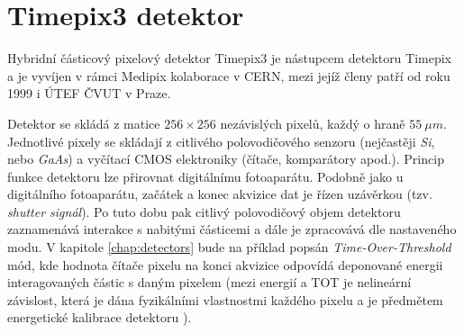 \section{Timepix3 detektor}
Hybridní částicový pixelový detektor Timepix3\cite{timepix3} je nástupcem detektoru Timepix\cite{timepix} a je vyvíjen v rámci Medipix kolaborace v CERN, mezi jejíž členy patří od roku 1999 i ÚTEF ČVUT v Praze.

Detektor se skládá z matice $256\times256$ nezávislých pixelů, každý o hraně $55~\mu m$. 
Jednotlivé pixely se skládají z citlivého polovodičového senzoru (nejčastěji \textit{Si}, nebo \textit{GaAs}) a vyčítací CMOS elektroniky (čítače, komparátory apod.). Princip funkce detektoru lze přirovnat digitálnímu fotoaparátu. Podobně jako u digitálního fotoaparátu, začátek a konec akvizice dat je řízen uzávěrkou (tzv. \textit{shutter signál}). Po tuto dobu pak citlivý polovodičový objem detektoru zaznamenává interakce s nabitými částicemi a dále je zpracovává dle nastaveného modu. V kapitole \ref{chap:detectors} bude na příklad popsán \textit{Time-Over-Threshold} mód, kde hodnota čítače pixelu na konci akvizice odpovídá deponované energii interagovaných částic s daným pixelem (mezi energií a TOT je nelineární závislost, která je dána fyzikálními vlastnostmi každého pixelu a je předmětem energetické kalibrace detektoru \cite{Jakubek2011S262}). 

